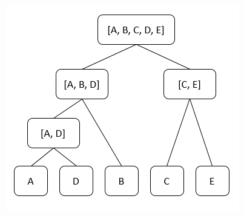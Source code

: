\documentclass{beamer}
\begin{document}
\begin{frame}[fragile]
\begin{columns}[c]
	\begin{figure}
		\includegraphics[width=1\linewidth]{divisive}
	\end{figure}
	
\end{columns}

\end{frame}

\end{document}
